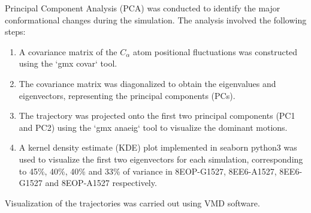 Principal Component Analysis (PCA) was conducted to identify the major conformational changes during the simulation. The analysis involved the following steps:
\begin{enumerate}
    \item A covariance matrix of the $C_\alpha$ atom positional fluctuations was constructed using the `gmx covar` tool. 
    \item The covariance matrix was diagonalized to obtain the eigenvalues and eigenvectors, representing the principal components (PCs). 
    \item The trajectory was projected onto the first two principal components (PC1 and PC2) using the `gmx anaeig` tool to visualize the dominant motions.  
    \item A kernel density estimate (KDE) plot implemented in seaborn python3 was used to visualize the first two eigenvectors for each simulation, corresponding to 45\%, 40\%, 40\% and 33\% of variance in 8EOP-G1527, 8EE6-A1527, 8EE6-G1527 and 8EOP-A1527 respectively. 
\end{enumerate}

Visualization of the trajectories was carried out using VMD software. 
